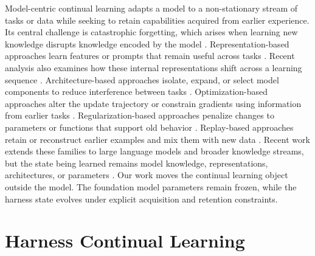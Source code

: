 \documentclass{article}
\begin{document}
Model-centric continual learning adapts a model to a non-stationary stream of
tasks or data while seeking to retain capabilities acquired from earlier
experience. Its central challenge is catastrophic forgetting, which arises
when learning new knowledge disrupts knowledge encoded by the model
\citep{kirkpatrick2017overcoming,delange2021continual,
wang2024comprehensive,kangdon}. Representation-based approaches learn features or
prompts that remain useful across tasks
\citep{wang2022l2p,wang2022dualpromptcomplementarypromptingrehearsalfree}.
Recent analysis also examines how these internal representations shift across a
learning sequence \citep{kim2025measuringrepresentational}.
Architecture-based approaches isolate, expand, or select model components to
reduce interference between tasks
\citep{liu2026cp,lu2024revisitingarchitectures}.
Optimization-based approaches alter the update trajectory or constrain
gradients using information from earlier tasks
\citep{lopezpaz2017gem,abbes2026replaygradient,
shang2025divideorthogonalize}.
Regularization-based approaches penalize changes to parameters or functions
that support old behavior
\citep{kirkpatrick2017overcoming,lewandowski2025spectralregularization}.
Replay-based approaches retain or reconstruct earlier examples and mix them
with new data
\citep{urettini2025ocar,wang2025cutreplay,
yue2025tdgr,bellitto2024saliencyreplay}. Recent
work extends these families
to large language models and broader knowledge streams, but the state being
learned remains model knowledge, representations, architectures, or parameters
\citep{liang2026gated,zhang2026multi}. Our work
moves the continual learning object outside the model. The foundation model
parameters remain frozen, while the harness state evolves under explicit
acquisition and retention constraints.

\section{Harness Continual Learning}
\label{sec:hcl_framework}
\end{document}
